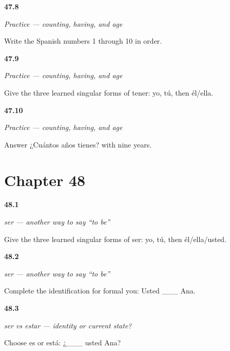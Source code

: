 \noindent\begin{minipage}[t]{\linewidth}
\raggedright
\hypertarget{review-ES-C08-practice-count-ten}{\textbf{47.8}} \emph{Practice — counting, having, and age}\par
\small Write the Spanish numbers 1 through 10 in order.
\end{minipage}\par\medskip

\noindent\begin{minipage}[t]{\linewidth}
\raggedright
\hypertarget{review-ES-C08-practice-tener-singular}{\textbf{47.9}} \emph{Practice — counting, having, and age}\par
\small Give the three learned singular forms of tener: yo, tú, then él/ella.
\end{minipage}\par\medskip

\noindent\begin{minipage}[t]{\linewidth}
\raggedright
\hypertarget{review-ES-C08-practice-age-nine}{\textbf{47.10}} \emph{Practice — counting, having, and age}\par
\small Answer ¿Cuántos años tienes? with nine years.
\end{minipage}\par\medskip

\section*{Chapter 48}

\noindent\begin{minipage}[t]{\linewidth}
\raggedright
\hypertarget{review-ES-C09-ser-singular-forms}{\textbf{48.1}} \emph{ser — another way to say “to be”}\par
\small Give the three learned singular forms of ser: yo, tú, then él/ella/usted.
\end{minipage}\par\medskip

\noindent\begin{minipage}[t]{\linewidth}
\raggedright
\hypertarget{review-ES-C09-ser-identity}{\textbf{48.2}} \emph{ser — another way to say “to be”}\par
\small Complete the identification for formal you: Usted \_\_\_ Ana.
\end{minipage}\par\medskip

\noindent\begin{minipage}[t]{\linewidth}
\raggedright
\hypertarget{review-ES-C09-ser-vs-estar-identify}{\textbf{48.3}} \emph{ser vs estar — identity or current state?}\par
\small Choose es or está: ¿\_\_\_ usted Ana?
\end{minipage}\par\medskip

